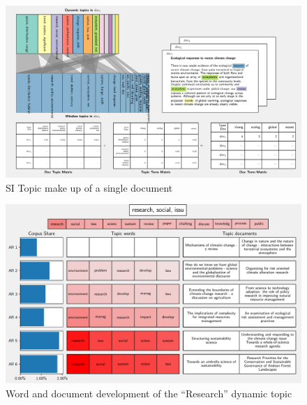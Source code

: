 \documentclass{article}
\begin{document}
\begin{linenumbers}
	\begin{figure}
		\begin{center}
			\includegraphics[width=1\linewidth]{plots/single_doc_3_536594.pdf}
			\caption{SI Topic make up of a single document}
			\label{doc-topic}
		\end{center}
	\end{figure}
	
	\begin{figure}
		\begin{center}
			\includegraphics[width=1\linewidth]{plots/single_topic_3_11046.pdf}
			\caption{Word and document development of the ``Research'' dynamic topic}
			\label{sus}
		\end{center}
	\end{figure}
		
	\end{linenumbers}

\linespread{1}


\end{document}
